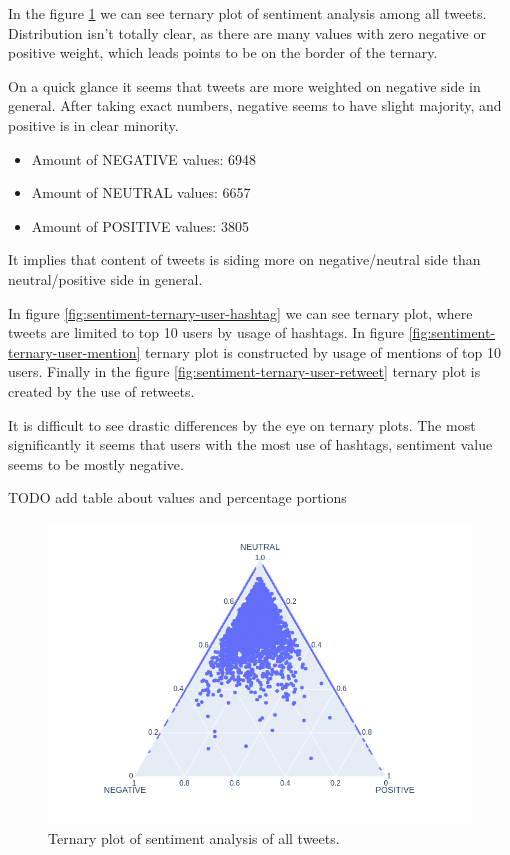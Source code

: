 \documentclass[conference]{IEEEtran}
\begin{document}
    In the figure \ref{fig:sentiment-ternary-all} we can see ternary plot of sentiment analysis among all tweets.
    Distribution isn't totally clear, as there are many values with zero negative or positive weight, which leads points to be on the border of the ternary.

    On a quick glance it seems that tweets are more weighted on negative side in general.
    After taking exact numbers, negative seems to have slight majority, and positive is in clear minority.

    \begin{itemize}
        \item Amount of NEGATIVE values: 6948
        \item Amount of NEUTRAL values: 6657
        \item Amount of POSITIVE values: 3805
    \end{itemize}

    It implies that content of tweets is siding more on negative/neutral side than neutral/positive side in general.

    In figure \ref{fig:sentiment-ternary-user-hashtag} we can see ternary plot, where tweets are limited to top 10 users by usage of hashtags.
    In figure \ref{fig:sentiment-ternary-user-mention} ternary plot is constructed by usage of mentions of top 10 users.
    Finally in the figure \ref{fig:sentiment-ternary-user-retweet} ternary plot is created by the use of retweets.

    It is difficult to see drastic differences by the eye on ternary plots. The most significantly it seems that users with the most use
    of hashtags, sentiment value seems to be mostly negative.

    TODO add table about values and percentage portions

    \begin{figure}
        \includegraphics[scale=0.4]{figures/sentiment_ternary_all}
        \caption{Ternary plot of sentiment analysis of all tweets.}
        \label{fig:sentiment-ternary-all}
    \end{figure}
\end{document}
